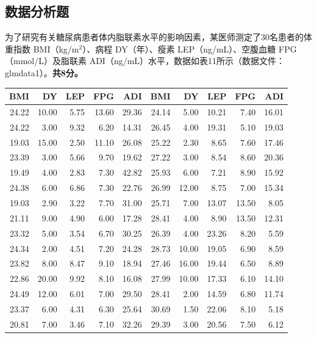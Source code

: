 \par\addvspace{8pt}\noindent\begin{minipage}{\linewidth}

\subsection{数据分析题}


为了研究有关糖尿病患者体内脂联素水平的影响因素，某医师测定了30名患者的体重指数 BMI（kg/m\(^2\)）、病程 DY（年）、瘦素 LEP（ng/mL）、空腹血糖 FPG（mmol/L）及脂联素 ADI（ng/mL）水平，数据如表11所示（数据文件：glmdata1）。\textbf{共8分。}

\begin{center}\small
\begin{tabular}{rrrrr@{\hspace{5mm}}rrrrr}
\toprule
BMI & DY & LEP & FPG & ADI & BMI & DY & LEP & FPG & ADI\\
\midrule
24.22 & 10.00 & 5.75 & 13.60 & 29.36 & 24.14 & 5.00 & 10.21 & 7.40 & 16.01\\
24.22 & 3.00 & 9.32 & 6.20 & 14.31 & 26.45 & 4.00 & 19.31 & 5.10 & 19.03\\
19.03 & 15.00 & 2.50 & 11.10 & 26.08 & 25.22 & 2.30 & 8.65 & 7.60 & 17.46\\
23.39 & 3.00 & 5.66 & 9.70 & 19.62 & 27.22 & 3.00 & 8.54 & 8.60 & 20.36\\
19.49 & 4.00 & 2.83 & 7.30 & 42.82 & 25.93 & 6.00 & 7.21 & 8.90 & 15.92\\
24.38 & 6.00 & 6.86 & 7.30 & 22.76 & 26.99 & 12.00 & 8.75 & 7.00 & 15.34\\
19.03 & 2.90 & 3.22 & 7.70 & 31.00 & 25.71 & 7.00 & 13.07 & 13.50 & 8.05\\
21.11 & 9.00 & 4.90 & 6.00 & 17.28 & 28.41 & 4.00 & 8.90 & 13.50 & 12.31\\
23.32 & 5.00 & 3.54 & 6.70 & 30.25 & 26.39 & 4.00 & 23.26 & 8.20 & 5.59\\
24.34 & 2.00 & 4.51 & 7.20 & 24.28 & 28.73 & 10.00 & 19.05 & 6.90 & 8.59\\
23.82 & 8.00 & 8.47 & 9.10 & 18.94 & 27.46 & 16.00 & 19.44 & 6.50 & 8.89\\
22.86 & 20.00 & 9.92 & 8.10 & 16.08 & 27.99 & 10.00 & 17.33 & 6.10 & 14.10\\
24.49 & 12.00 & 6.01 & 7.00 & 29.50 & 28.41 & 2.00 & 14.59 & 6.80 & 11.74\\
23.37 & 6.00 & 4.31 & 6.30 & 25.64 & 30.69 & 1.50 & 22.06 & 8.10 & 5.18\\
20.81 & 7.00 & 3.46 & 7.10 & 32.26 & 29.39 & 3.00 & 20.56 & 7.50 & 6.12\\
\bottomrule\end{tabular}\end{center}


\end{minipage}
